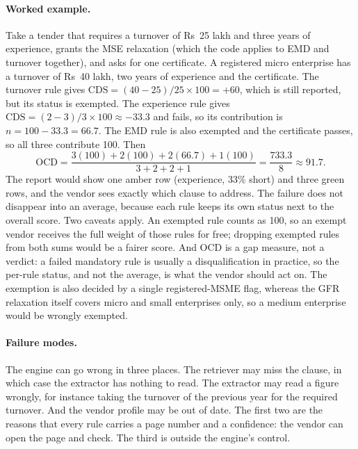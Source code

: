 \paragraph{Worked example.} Take a tender that requires a turnover of Rs~25 lakh and three years of experience, grants the MSE relaxation (which the code applies to EMD and turnover together), and asks for one certificate. A registered micro enterprise has a turnover of Rs~40 lakh, two years of experience and the certificate. The turnover rule gives $\mathrm{CDS}=(40-25)/25\times100=+60$, which is still reported, but its status is exempted. The experience rule gives $\mathrm{CDS}=(2-3)/3\times100\approx-33.3$ and fails, so its contribution is $n=100-33.3=66.7$. The EMD rule is also exempted and the certificate passes, so all three contribute 100. Then
\begin{equation}
\mathrm{OCD}=\frac{3(100)+2(100)+2(66.7)+1(100)}{3+2+2+1}=\frac{733.3}{8}\approx 91.7.
\end{equation}
The report would show one amber row (experience, 33\% short) and three green rows, and the vendor sees exactly which clause to address. The failure does not disappear into an average, because each rule keeps its own status next to the overall score. Two caveats apply. An exempted rule counts as 100, so an exempt vendor receives the full weight of those rules for free; dropping exempted rules from both sums would be a fairer score. And OCD is a gap measure, not a verdict: a failed mandatory rule is usually a disqualification in practice, so the per-rule status, and not the average, is what the vendor should act on. The exemption is also decided by a single registered-MSME flag, whereas the GFR relaxation itself covers micro and small enterprises only, so a medium enterprise would be wrongly exempted.

\paragraph{Failure modes.} The engine can go wrong in three places. The retriever may miss the clause, in which case the extractor has nothing to read. The extractor may read a figure wrongly, for instance taking the turnover of the previous year for the required turnover. And the vendor profile may be out of date. The first two are the reasons that every rule carries a page number and a confidence: the vendor can open the page and check. The third is outside the engine's control.

